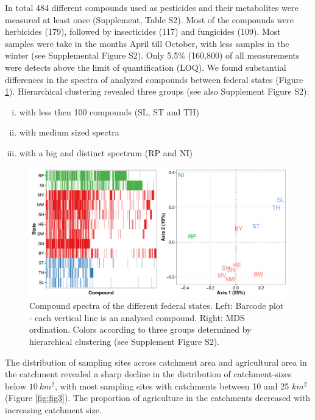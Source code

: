 \documentclass[journal=esthag,manuscript=article]{achemso}
\begin{document}
In total 484 different compounds used as pesticides and their metabolites were measured at least once (Supplement, Table S2). 
Most of the compounds were herbicides (179), followed by insecticides (117) and fungicides (109).
Most samples were take in the months April till October, with less samples in the winter (see Supplemental Figure S2).
Only 5.5\% (160,800) of all measurements were detects above the limit of quantification (LOQ).
We found substantial differences in the spectra of analyzed compounds between federal states (Figure \ref{fig:fig2}).
Hierarchical clustering revealed three groups (see also Supplement Figure S2):

\begin{enumerate}[i)]
	\item with less then 100 compounds (SL, ST and TH)
	\item with medium sized spectra
	\item with a big and distinct spectrum (RP and NI)
\end{enumerate}

\begin{figure}[ht]
  \includegraphics[width=\textwidth]{figure2.pdf}
  \caption{Compound spectra of the different federal states. Left: Barcode plot - each vertical line is an analysed compound. Right: MDS ordination. 
  Colors according to three groups determined by hierarchical clustering (see Supplement Figure S2).}
  \label{fig:fig2}
\end{figure}

The distribution of sampling sites across catchment area and agricultural area in the catchment revealed a sharp decline in the distribution of catchment-sizes below $10~km^2$, with most sampling sites with catchments between 10 and 25 $km^2$ (Figure \ref{fig:fig3}).
The proportion of agriculture in the catchments decreased with increasing catchment size.
\end{document}
